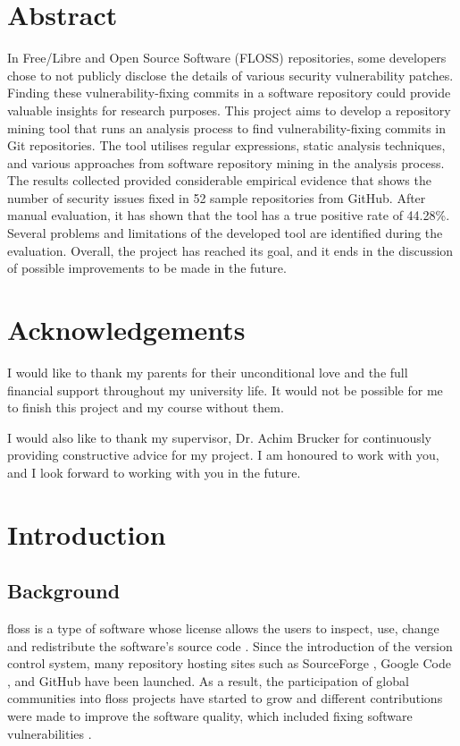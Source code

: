 \documentclass[12pt, a4paper]{report}
\begin{document}
\newpage

\chapter*{Abstract}
In Free/Libre and Open Source Software (FLOSS) repositories, some developers chose to not publicly
disclose the details of various security vulnerability patches. Finding these vulnerability-fixing
commits in a software repository could provide valuable insights for research purposes. This project
aims to develop a repository mining tool that runs an analysis process to find vulnerability-fixing
commits in Git repositories. The tool utilises regular expressions, static analysis techniques, and
various approaches from software repository mining in the analysis process. The results collected
provided considerable empirical evidence that shows the number of security issues fixed in 52 sample
repositories from GitHub. After manual evaluation, it has shown that the tool has a true positive
rate of 44.28\%. Several problems and limitations of the developed tool are identified during the
evaluation. Overall, the project has reached its goal, and it ends in the discussion of possible
improvements to be made in the future.

\chapter*{Acknowledgements}
I would like to thank my parents for their unconditional love and the full financial support
throughout my university life. It would not be possible for me to finish this project and my course
without them.

I would also like to thank my supervisor, Dr. Achim Brucker for continuously providing constructive
advice for my project. I am honoured to work with you, and I look forward to working with you in the
future.

\newpage

\tableofcontents

\listoffigures

\listoftables

\lstlistoflistings

\newpage


\chapter{Introduction}
\section{Background}
\acrfull{floss} is a type of software whose license allows the users to inspect, use, change and
redistribute the software's source code \cite{crowston_2012}. Since the introduction of the version
control system, many repository hosting sites such as SourceForge \cite{sourceforge}, Google Code
\cite{google_code}, and GitHub \cite{github} have been launched. As a result, the participation of
global communities into \acrshort{floss} projects have started to grow and different contributions
were made to improve the software quality, which included fixing software vulnerabilities
\cite{dabbish_2012}.
\end{document}

